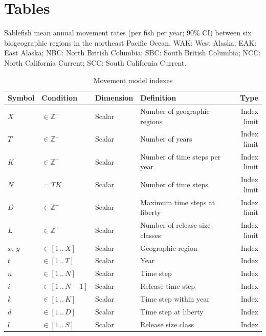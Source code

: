 \documentclass{article}
\begin{document}
\section{Tables}


\begin{table}[h]
  \begin{center}
  \caption{Sablefish mean annual movement rates (per fish per year; 90\%{} CI) between six biogeographic regions in the northeast Pacific Ocean. WAK: West Alaska; EAK: East Alaska; NBC: North British Columbia; SBC: South British Columbia; NCC: North California Current; SCC: South California Current.}
  \label{tab:movement-rate-regions-6-mean}
  \end{center}
\end{table}


\begin{table}[ht]
  \centering
  \caption{Movement model indexes}
  \renewcommand\arraystretch{1.2}
  \label{tab:model-indexes}
  \begin{tabular}{l l l l r}
    \toprule
    \textbf{Symbol} & \textbf{Condition} & \textbf{Dimension} & \textbf{Definition} & \textbf{Type} \\
    \toprule
    $X$ & $\in \mathbb{Z}^{+}$ & Scalar & Number of geographic regions & Index limit \\
    $T$ & $\in \mathbb{Z}^{+}$ & Scalar & Number of years & Index limit \\
    $K$ & $\in \mathbb{Z}^{+}$ & Scalar & Number of time steps per year & Index limit \\
    $N$ & $ = TK $ & Scalar & Number of time steps & Index limit \\
    $D$ & $\in \mathbb{Z}^{+}$ & Scalar & Maximum time steps at liberty & Index limit \\
    $L$ & $\in \mathbb{Z}^{+}$ & Scalar & Number of release size classes & Index limit \\
    \midrule
    $x, \, y$ & $\in \left[1 \, .. \, X \right]$ & Scalar & Geographic region & Index \\
    $t$ & $\in \left[1 \, .. \, T \right]$ & Scalar & Year & Index \\
    $n$ & $\in \left[1 \, .. \, N \right]$ & Scalar & Time step & Index \\
    $i$ & $\in \left[1 \, .. \, N\!-\!1 \right]$ & Scalar & Release time step & Index \\
    $k$ & $\in \left[1 \, .. \, K \right]$ & Scalar & Time step within year & Index \\
    $d$ & $\in \left[1 \, .. \, D \right]$ & Scalar & Time step at liberty & Index \\
    $l$ & $\in \left[1 \, .. \, S \right]$ & Scalar & Release size class & Index \\
    \bottomrule
  \end{tabular}
\end{table}
\end{document}

